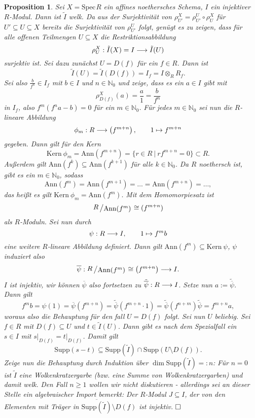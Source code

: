 \documentclass[11pt]{book}
\newtheorem{proposition}[theorem]{Proposition}
\theoremstyle{nonumberbreak}
\newenvironment{pr}[1][]{\ifthenelse{\equal{#1}{}}{\proof}{\proof[#1]}\rm}{\endproof}
\newcommand{\spec}{\mathrm{Spec} \hspace{1pt} }
\newcommand{\kernel}{\mathrm{Kern}\ }
\newcommand{\slant}[2]{{\raisebox{.1em}{$#1$}\left/\raisebox{-.1em}{$#2$}\right.}}
\begin{document}
\begin{spacing}{1.4}
\begin{proposition}   %
Sei $X= \spec R$ ein affines noethersches Schema, $I$ ein injektiver $R$-Modul. Dann ist $\tilde{I}$ welk.
\begin{pr}
Da aus der Surjektivität von $\rho^{X}_{U'} = \rho^{U}_{U'} \circ \rho^{X}_{U}$ für $U' \subseteq U \subseteq X$ bereits die Surjektivität von $\rho^{U}_{U'}$ folgt, genügt es zu zeigen, dass für alle offenen Teilmengen $U \subseteq X$ die Restriktionsabbildung 
$$\rho^{X}_{U}: \tilde{I}(X) = I \longrightarrow \tilde{I}(U)$$
surjektiv ist. Sei dazu zunächst $U=D(f)$ für ein $f\in R$. Dann ist 
$$\tilde{I}(U) = \tilde{I}(D(f)) = I_f = I\otimes_R R_f.$$
Sei also $\frac{b}{f^n} \in I_f$ mit $b \in I$ und $n \in \mathbb{N}_0$ und zeige, dass es ein $a \in I$ gibt mit 
$$\rho^{X}_{D(f)}(a) = \frac{a}{1} = \frac{b}{f^n}$$
in $I_f$, also
$f^{m} \left( f^{n} a - b \right) = 0 $
für ein $m \in \mathbb{N}_0$. Für jedes $m \in \mathbb{N}_0$ sei nun die $R$-lineare Abbildung 
$$\phi_m: R \longrightarrow \left( f^{m+n}\right), \qquad 1 \mapsto f^{m+n}$$
gegeben. Dann gilt für den Kern
$$\kernel \phi_m = \mathrm{Ann}(f^{m+n}) = \{ r \in R \ \vert \ r f^{m+n} = 0 \} \subset R.$$
Außerdem gilt $\mathrm{Ann}(f^{k}) \subseteq \mathrm{Ann}(f^{k+1})$ für alle $k \in \mathbb{N}_0$. Da $R$ noethersch ist, gibt es ein $m \in \mathbb{N}_0$, sodass
$$\mathrm{Ann}(f^m) = \mathrm{Ann}(f^{m+1}) = \ldots = \mathrm{Ann}(f^{m+n}) = \ldots, $$
das heißt es gilt $\kernel \phi_m = \mathrm{Ann}(f^m)$. Mit dem Homomorpiesatz ist 
$$\slant{R}{\mathrm{Ann}(f^m)} \cong (f^{m+n})$$
als $R$-Moduln. Sei nun durch
$$\psi: R \longrightarrow I, \qquad 1 \mapsto f^{m}b$$
eine weitere $R$-lineare Abbildung definiert. Dann gilt $\mathrm{Ann}(f^m) \subseteq \kernel \psi$, $\psi$ induziert also 
$$\overline{\psi}: \slant{R}{\mathrm{Ann}(f^m)} \cong \left(f^{m+n}\right) \la I.$$
$I$ ist injektiv, wir können $\overline{\psi}$ also fortsetzen zu $\tilde{\overline{\psi}}: R \longrightarrow I$. Setze nun $a:= \tilde{\overline{\psi}}$. Dann gilt
$$f^{m} b = \psi(1) = \overline{\psi}(f^{m+n}) = \tilde{\overline{\psi}}(f^{m+n} \cdot 1) = \tilde{\overline{\psi}}(f^{n+m}) \tilde{\overline{\psi}} = f^{m+n} a,$$
woraus also die Behauptung für den fall $U= D(f)$ folgt. Sei nun $U$ beliebig. Sei $f \in R$ mit $D(f) \subseteq U$ und $t \in \tilde{I}(U)$. Dann gibt es nach dem Spezialfall ein $s \in I$ mit $s \vert_{D(f)} = t\vert_{D(f)}$. Damit gilt 
$$\mathrm{Supp}(s-t) \subseteq \mathrm{Supp}(\tilde{I}) \cap \mathrm{Supp}(U \setminus D(f)).$$
Zeige nun die Behauptung durch Induktion über $\dim \mathrm{Supp}(\tilde{I})=:n$: Für $n=0$ ist $\tilde{I}$ eine Wolkenkratzergarbe (bzw. eine Summe von Wolkenkratzergarben) und damit welk.
Den Fall $n\geqslant 1$ wollen wir nicht diskutieren - allerdings sei an dieser Stelle ein algebraischer Import bemerkt: Der $R$-Modul $J \subseteq I$, der von den Elementen mit Träger in $\overline{\mathrm{Supp}(\tilde{I})} \setminus D(f)$ ist injektiv. $\hfill \Box$
\end{pr}


\end{proposition}
\end{spacing}
\end{document}
